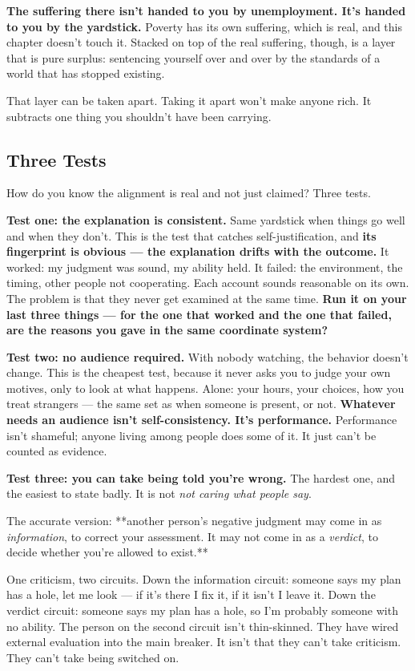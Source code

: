 \documentclass[11pt,a4paper]{article}
\begin{document}
\textbf{The suffering there isn't handed to you by unemployment. It's handed to you by the yardstick.} Poverty has its own suffering, which is real, and this chapter doesn't touch it. Stacked on top of the real suffering, though, is a layer that is pure surplus: sentencing yourself over and over by the standards of a world that has stopped existing.

That layer can be taken apart. Taking it apart won't make anyone rich. It subtracts one thing you shouldn't have been carrying.

\subsection{Three Tests}

How do you know the alignment is real and not just claimed? Three tests.

\textbf{Test one: the explanation is consistent.} Same yardstick when things go well and when they don't. This is the test that catches self-justification, and \textbf{its fingerprint is obvious --- the explanation drifts with the outcome.} It worked: my judgment was sound, my ability held. It failed: the environment, the timing, other people not cooperating. Each account sounds reasonable on its own. The problem is that they never get examined at the same time. \textbf{Run it on your last three things --- for the one that worked and the one that failed, are the reasons you gave in the same coordinate system?}

\textbf{Test two: no audience required.} With nobody watching, the behavior doesn't change. This is the cheapest test, because it never asks you to judge your own motives, only to look at what happens. Alone: your hours, your choices, how you treat strangers --- the same set as when someone is present, or not. \textbf{Whatever needs an audience isn't self-consistency. It's performance.} Performance isn't shameful; anyone living among people does some of it. It just can't be counted as evidence.

\textbf{Test three: you can take being told you're wrong.} The hardest one, and the easiest to state badly. It is not \textit{not caring what people say}.

The accurate version: **another person's negative judgment may come in as \textit{information}, to correct your assessment. It may not come in as a \textit{verdict}, to decide whether you're allowed to exist.**

One criticism, two circuits. Down the information circuit: someone says my plan has a hole, let me look --- if it's there I fix it, if it isn't I leave it. Down the verdict circuit: someone says my plan has a hole, so I'm probably someone with no ability. The person on the second circuit isn't thin-skinned. They have wired external evaluation into the main breaker. It isn't that they can't take criticism. They can't take being switched on.
\end{document}
